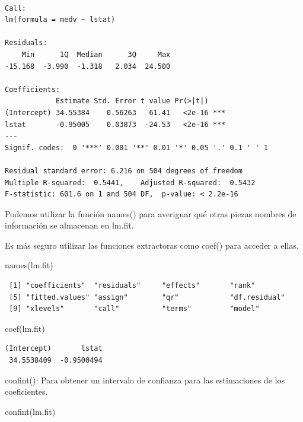 \documentclass[
  letterpaper,
  DIV=11,
  numbers=noendperiod]{scrartcl}
\newenvironment{Shaded}{\begin{snugshade}}{\end{snugshade}}
\newcommand{\FunctionTok}[1]{\textcolor[rgb]{0.28,0.35,0.67}{#1}}
\newcommand{\NormalTok}[1]{\textcolor[rgb]{0.00,0.23,0.31}{#1}}
\begin{document}
\begin{verbatim}

Call:
lm(formula = medv ~ lstat)

Residuals:
    Min      1Q  Median      3Q     Max 
-15.168  -3.990  -1.318   2.034  24.500 

Coefficients:
            Estimate Std. Error t value Pr(>|t|)    
(Intercept) 34.55384    0.56263   61.41   <2e-16 ***
lstat       -0.95005    0.03873  -24.53   <2e-16 ***
---
Signif. codes:  0 '***' 0.001 '**' 0.01 '*' 0.05 '.' 0.1 ' ' 1

Residual standard error: 6.216 on 504 degrees of freedom
Multiple R-squared:  0.5441,    Adjusted R-squared:  0.5432 
F-statistic: 601.6 on 1 and 504 DF,  p-value: < 2.2e-16
\end{verbatim}

Podemos utilizar la función names() para averiguar qué otras piezas
nombres de información se almacenan en lm.fit.

Es más seguro utilizar las funciones extractoras como coef() para
acceder a ellas.

\begin{Shaded}
\begin{Highlighting}[]
\FunctionTok{names}\NormalTok{(lm.fit)}
\end{Highlighting}
\end{Shaded}

\begin{verbatim}
 [1] "coefficients"  "residuals"     "effects"       "rank"         
 [5] "fitted.values" "assign"        "qr"            "df.residual"  
 [9] "xlevels"       "call"          "terms"         "model"        
\end{verbatim}

\begin{Shaded}
\begin{Highlighting}[]
\FunctionTok{coef}\NormalTok{(lm.fit)}
\end{Highlighting}
\end{Shaded}

\begin{verbatim}
(Intercept)       lstat 
 34.5538409  -0.9500494 
\end{verbatim}

confint(): Para obtener un intervalo de confianza para las estimaciones
de los coeficientes.

\begin{Shaded}
\begin{Highlighting}[]
\FunctionTok{confint}\NormalTok{(lm.fit)}
\end{Highlighting}
\end{Shaded}
\end{document}
